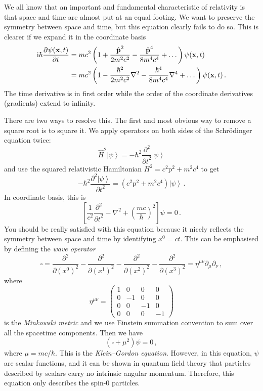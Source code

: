 \documentclass{article}
\theoremstyle{plain}\theoremheaderfont{\normalfont\itshape}\theorembodyfont{\rmfamily}\theoremseparator{.}\newtheorem*{rem}{Remark}\newtheorem*{ex}{Example}\newtheorem*{proof}{Proof}\newtheorem*{altp}{Alternative proof}
\theoremstyle{plain}\theoremheaderfont{\normalfont\bfseries}\theorembodyfont{\rmfamily}\theoremseparator{.}\newtheorem{thm}{Theorem}[section]\newtheorem{lem}[thm]{Lemma}\newtheorem{prop}[thm]{Proposition}\newtheorem*{cor}{Corollary}\newtheorem{defn}[thm]{Definition}\newtheorem{clm}[thm]{Claim}\newtheorem{clminproof}{Claim}
\theoremstyle{break}\theoremheaderfont{\normalfont\itshape}\theorembodyfont{\rmfamily}\theoremseparator{.\medskip}\newtheorem*{proofskip}{Proof}\newtheorem*{exs}{Examples}\newtheorem*{rems}{Remarks}
\theoremstyle{break}\theoremheaderfont{\normalfont\bfseries}\theorembodyfont{\rmfamily}\theoremseparator{.\medskip}\newtheorem{lemskip}[thm]{Lemma}\newtheorem{defnskip}[thm]{Definition}\newtheorem{propskip}[thm]{Proposition}\newtheorem{thmskip}[thm]{Theorem}
\numberwithin{equation}{section}
\newcommand{\ii}{\mathrm{i}}
\newcommand{\pdv}[3][]{\frac{\partial^{#1} #2}{{\partial #3}^{#1}}}
\newcommand{\ket}[1]{\left| #1 \right\rangle}
\newcommand{\vb}[1]{\bm{\mathrm{#1}}}
\newcommand{\laplacian}{\nabla^2}
\begin{document}
    We all know that an important and fundamental characteristic of relativity is that space and time are almost put at an equal footing. We want to preserve the symmetry between space and time, but this equation clearly fails to do so. This is clearer if we expand it in the coordinate basis
    \begin{align}
        \ii\hbar\pdv{\psi(\vb{x},t)}{t}&=mc^2\left(1+\frac{\hat{\vb{p}}^2}{2m^2c^2}-\frac{\hat{\vb{p}}^4}{8m^4 c^4}+\dots\right)\psi(\vb{x},t)\notag \\
        &=mc^2\left(1-\frac{\hbar^2}{2m^2c^2}\laplacian-\frac{\hbar^4}{8m^4 c^4}\nabla^4+\dots\right)\psi(\vb{x},t)\,.
    \end{align}
    The time derivative is in first order while the order of the coordinate derivatives (gradients) extend to infinity.

    There are two ways to resolve this. The first and most obvious way to remove a square root is to square it. We apply operators on both sides of the Schr\"{o}dinger equation twice:
    \begin{equation}
        \hat{H}^2\ket{\psi}=-\hbar^2\pdv[2]{}{t}\ket{\psi}
    \end{equation}
    and use the squared relativistic Hamiltonian \(H^2=c^2\vb{p}^2+m^2c^4\) to get
    \begin{equation}
        -\hbar^2\pdv[2]{\ket{\psi}}{t}=\left(c^2\vb{p}^2+m^2 c^4\right)\ket{\psi}\,.
    \end{equation}
    In coordinate basis, this is
    \begin{equation}
        \left[\frac{1}{c^2}\pdv[2]{}{t}-\laplacian+\left(\frac{mc}{\hbar}\right)^2\right]\psi=0\,.
    \end{equation}
    You should be really satisfied with this equation because it nicely reflects the symmetry between space and time by identifying \(x^0=ct\). This can be emphasised by defining the \textit{wave operator}
    \begin{equation}
        \square=\pdv[2]{}{(x^0)}-\pdv[2]{}{(x^1)}-\pdv[2]{}{(x^2)}-\pdv[2]{}{(x^3)}=\eta^{\mu\nu}\partial_\mu\partial_\nu\,,
    \end{equation}
    where
    \begin{equation}
        \eta^{\mu\nu}=\begin{pmatrix}
            1 & 0 & 0 & 0 \\
            0 & -1 & 0 & 0 \\
            0 & 0 & -1 & 0 \\
            0 & 0 & 0 & -1
        \end{pmatrix}
    \end{equation}
    is the \textit{Minkowski metric} and we use Einstein summation convention to sum over all the spacetime components. Then we have
    \begin{equation}
        (\square+\mu^2)\psi=0\,,
    \end{equation}
    where \(\mu=mc/\hbar\). This is the \textit{Klein--Gordon equation}. However, in this equation, \(\psi\) are scalar functions, and it can be shown in quantum field theory that particles described by scalars carry no intrinsic angular momentum. Therefore, this equation only describes the spin-0 particles.
\end{document}
